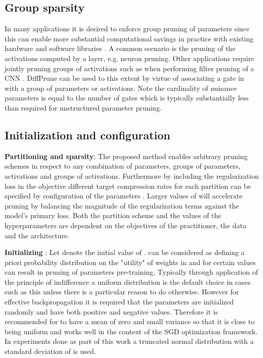 \documentclass[final,1p,times]{elsarticle}
\begin{document}
\subsection{Group sparsity}
In many applications it is desired to enforce group pruning of parameters since this can enable more substantial computational savings in practice with existing hardware and software libraries \cite{NIPS2016_6504}. A common scenario is the pruning of the activations computed by a layer, e.g. neuron pruning. Other applications require jointly pruning groups of activations such as when performing filter pruning of a CNN \cite{DBLP:conf/iclr/0022KDSG17}. DiffPrune can be used to this extent by virtue of associating a gate in  with a group of parameters or activations. Note the cardinality of nuisance parameters  is equal to the number of gates which is typically substantially less than required for unstructured parameter pruning.

\subsection{Initialization and configuration}
\textbf{Partitioning and sparsity}: The proposed method enables arbitrary pruning schemes in respect to any combination of parameters, groups of parameters, activations and groups of activations. Furthermore by including the regularization loss in the objective different target compression rates for each partition can be specified by configuration of the parameters . Larger values of  will accelerate pruning by balancing the magnitude of the  regularization terms against the model's primary loss. Both the partition scheme and the values of the hyperparameters are dependent on the objectives of the practitioner, the data and the architecture. \newline

\textbf{Initializing }: Let  denote the initial value of .  can be considered as defining a priori probability distribution on the "utility" of weights in  and for certain values can result in pruning of parameters pre-training. Typically through application of the principle of indifference a uniform distribution is the default choice in cases such as this unless there is a particular reason to do otherwise. However for effective backpropagation it is required that the parameters  are initialized randomly and have both positive and negative values. Therefore it is recommended for  to have a mean of zero and small variance so that it is close to being uniform and works well in the context of the SGD optimization framework. In experiments done as part of this work a truncated normal distribution with a standard deviation of  is used. \newline
\end{document}
